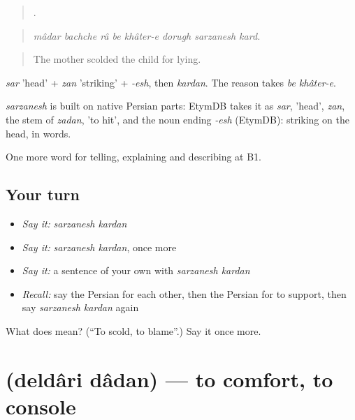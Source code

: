 \begin{quote}
       .
\end{quote}

\begin{quote}
\emph{mâdar bachche râ be khâter-e dorugh sarzanesh kard.}
\end{quote}

\begin{quote}
The mother scolded the child for lying.
\end{quote}

\emph{sar} 'head' + \emph{zan} 'striking' + \emph{-esh}, then \emph{kardan}. The reason takes \emph{be khâter-e}.

\begin{cousinweb}
\emph{sarzanesh} is built on native Persian parts: EtymDB takes it as \emph{sar}, 'head', \emph{zan}, the stem of \emph{zadan}, 'to hit', and the noun ending \emph{-esh} (EtymDB): striking on the head, in words.
\end{cousinweb}

\begin{grammarlens}[title={What you've built}]
One more word for telling, explaining and describing at B1.
\end{grammarlens}

\subsection*{Your turn}
\begin{itemize}
\raggedright
  \item \emph{Say it:} \emph{sarzanesh kardan}
  \item \emph{Say it:} \emph{sarzanesh kardan}, once more
  \item \emph{Say it:} a sentence of your own with \emph{sarzanesh kardan}
  \item \emph{Recall:} say the Persian for each other, then the Persian for to support, then say \emph{sarzanesh kardan} again
\end{itemize}

\begin{tcolorbox}[breakable,colback=teal!4,colframe=teal!35!black,title={Before you move on}]
What does   mean? (\textquotedblleft{}To scold, to blame\textquotedblright{}.) Say it once more.
\end{tcolorbox}
\section[\texorpdfstring{\fa{دلداری} \fa{دادن} (deldâri dâdan)}{دلداری دادن (deldâri dâdan)}]{  (deldâri dâdan) — to comfort, to console}

